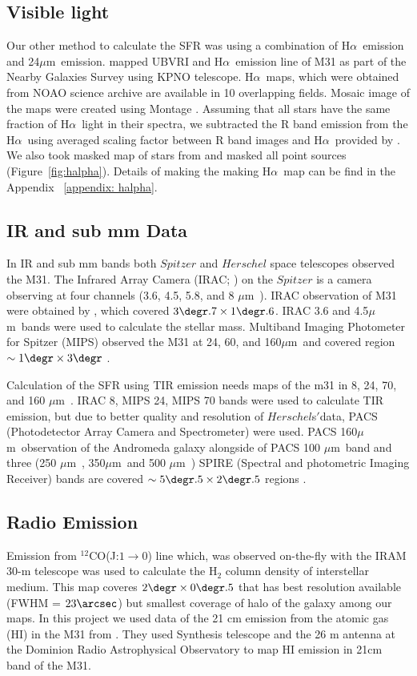 \documentclass[useAMS,usenatbib]{mn2e}
\newcommand \halpha    {H$\alpha $\ }
\newcommand \um    {$\mu$m\ }
\begin{document}
\subsection{Visible light}
Our other method to calculate the SFR was using a combination of \halpha emission and 24\um emission. \cite{Massey06, Massey07} mapped UBVRI and \halpha emission line of M31 as part of the Nearby Galaxies Survey using KPNO telescope. \halpha maps, which were obtained from NOAO science archive are available in 10 overlapping fields. Mosaic image of the maps were created using Montage \citep{Montage}. Assuming that all stars have the same fraction of \halpha light in their spectra, we subtracted the R band emission from the \halpha using averaged scaling factor between R band images and \halpha provided by \cite{Azimlu11}. We also took masked map of stars from \cite{Azimlu11} and masked all point sources (Figure~\ref{fig:halpha}). Details of making the making \halpha map can be find in the Appendix ~\ref{appendix: halpha}.

\subsection{IR and sub mm Data}
In IR and sub mm bands both $Spitzer$ \citep{Wener04} and $Herschel$ \citep{Pilbratt10}  space telescopes observed the M31. The Infrared Array Camera (IRAC; \citep{Fazio04}) on the $Spitzer$ is a camera observing at four channels (3.6, 4.5, 5.8, and 8 \um). IRAC observation of M31 were obtained by \cite{Barmby06}, which covered $3\degr.7 \times 1\degr.6$. IRAC 3.6 and 4.5\um bands  were used to calculate the stellar mass. Multiband Imaging Photometer for Spitzer (MIPS) observed the  M31 at 24, 60, and 160\um and covered region $\sim 1\degr \times 3\degr$ \citep{Gordon06}.

Calculation of the SFR using TIR emission needs maps of the m31 in 8, 24, 70, and 160 \um. IRAC 8, MIPS 24, MIPS 70 bands were used to calculate TIR emission, but due to better quality and resolution of $Herschel$s$'$data, PACS (Photodetector Array Camera and Spectrometer) \citep{Poglitch10} were used. PACS 160\um observation of the Andromeda galaxy alongside of PACS 100 \um band and three (250 \um, 350\um and 500 \um) SPIRE (Spectral and photometric Imaging Receiver) \citep{Griffin10} bands are covered $\sim 5\degr.5 \times 2\degr.5$ regions \citep{Fritz12}.

\subsection{Radio Emission}
Emission from $^{12}$CO(J:$1\rightarrow0$) line which, was observed on-the-fly with the IRAM 30-m telescope\citep{Nieten06} was used to calculate the H$_2$ column density of interstellar medium. This map coveres $2\degr \times 0\degr.5$ that has best resolution available (FWHM = $23\arcsec$) but smallest coverage of halo of the galaxy among our maps. In this project we used data of the 21 cm emission from the atomic gas (HI) in the M31 from \cite{chemin9}. They used Synthesis telescope and the 26 m antenna at the Dominion Radio Astrophysical Observatory to map HI emission in 21cm band of the M31.
\end{document}
